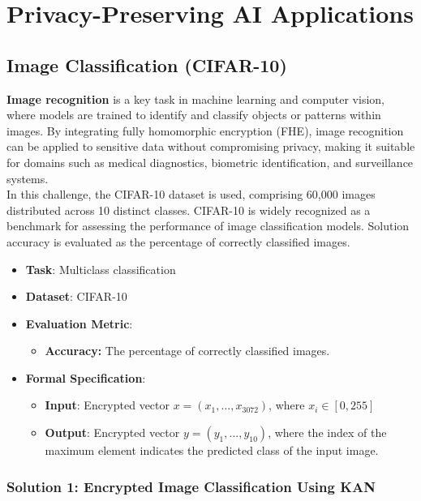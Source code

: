 \documentclass[article]{iacrtrans}
\begin{document}
\section{Privacy-Preserving AI Applications}

\subsection{Image Classification (CIFAR-10)}

\textbf{Image recognition} is a key task in machine learning and computer vision, where models are trained to identify and classify objects or patterns within images. By integrating fully homomorphic encryption (FHE), image recognition can be applied to sensitive data without compromising privacy, making it suitable for domains such as medical diagnostics, biometric identification, and surveillance systems.\\
In this challenge, the CIFAR-10 dataset is used, comprising 60,000 images distributed across 10 distinct classes. CIFAR-10 is widely recognized as a benchmark for assessing the performance of image classification models. Solution accuracy is evaluated as the percentage of correctly classified images.

\begin{itemize}
    \item \textbf{Task}: Multiclass classification
    \item \textbf{Dataset}: CIFAR-10
    \item \textbf{Evaluation Metric}:
        \begin{itemize}
            \item \textbf{Accuracy:} The percentage of correctly classified images.
        \end{itemize}
    \item \textbf{Formal Specification}: 
        \begin{itemize}
            \item \textbf{Input}: Encrypted vector \(x = (x_1, \ldots, x_{3072})\), where \(x_i \in [0,255]\)
            \item \textbf{Output}: Encrypted vector \(y=(y_1, ..., y_{10})\), where the index of the maximum element indicates the predicted class of the input image.
        \end{itemize}
\end{itemize}
 
\subsubsection{Solution 1: Encrypted Image Classification Using KAN}
\end{document}
